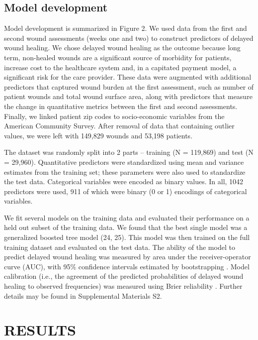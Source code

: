 \subsection{Model development}

Model development is summarized in Figure 2.  We used data from the
first and second wound assessments (weeks one and two) to construct
predictors of delayed wound healing.  We chose delayed wound healing
as the outcome because long term, non-healed wounds are a significant
source of morbidity for patients, increase cost to the healthcare
system and, in a capitated payment model, a significant risk for the
care provider. These data were augmented with additional predictors
that captured wound burden at the first assessment, such as number of
patient wounds and total wound surface area, along with predictors
that measure the change in quantitative metrics between the first and
second assessments.  Finally, we linked patient zip codes to
socio-economic variables from the American Community Survey.  After
removal of data that containing outlier values, we were left with
149,829 wounds and 53,198 patients.

The dataset was randomly split into 2 parts – training (N = 119,869)
and test (N = 29,960).  Quantitative predictors were standardized
using mean and variance estimates from the training set; these
parameters were also used to standardize the test data.  Categorical
variables were encoded as binary values.  In all, 1042 predictors were
used, 911 of which were binary (0 or 1) encodings of categorical
variables.

We fit several models on the training data and evaluated their
performance on a held out subset of the training data.  We found that
the best single model was a generalized boosted tree model (24, 25).
This model was then trained on the full training dataset and evaluated
on the test data.  The ability of the model to predict delayed wound
healing was measured by area under the receiver-operator curve (AUC),
with 95\% confidence intervals estimated by bootstrapping
\cite{Margolis2002}.  Model calibration (i.e., the agreement of the
predicted probabilities of delayed wound healing to observed
frequencies) was measured using Brier reliability \cite{Brier1950}.
Further details may be found in Supplemental Materials S2.

\section{RESULTS}

